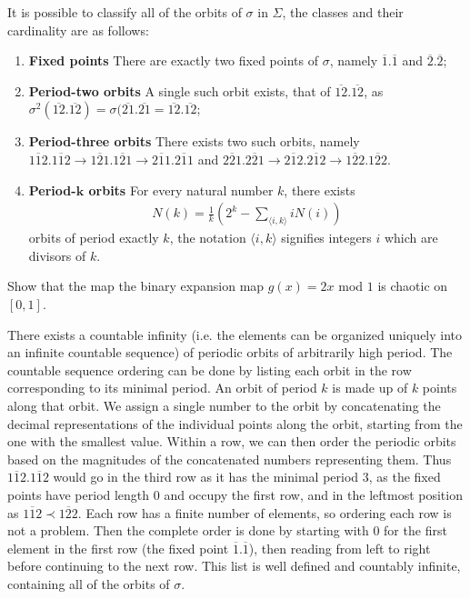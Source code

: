 It is possible to classify all of the orbits of $\sigma $ in $\Sigma$, the classes and their cardinality are as follows:
\begin{enumerate}
	\item \textbf{Fixed points} There are exactly two fixed points of $\sigma$, namely $\overline{1}\bm{.} \overline{1}$ and $\overline{2}\bm{.} \overline{2}$; 
	\item \textbf{Period-two orbits} A single such orbit exists, that of $\overline{12}\bm{.} \overline{12}$, as $\sigma^{2}(\overline{12}\bm{.} \overline{12}) = \sigma(\overline{21}\bm{.} \overline{21} = \overline{12}\bm{.} \overline{12}$;
	\item \textbf{Period-three orbits} There exists two such orbits, namely $\overline{112}\bm{.} \overline{112} \to \overline{121}\bm{.} \overline{121} \to \overline{211}\bm{.} \overline{211}$ and $\overline{221} \bm{.} \overline{221} \to \overline{212}\bm{.} \overline{212} \to \overline{122}\bm{.} \overline{122} $.
	\item \textbf{Period-$\bm{k} $ orbits} For every natural number $k$, there exists 
		\begin{align}
			\boxed{N(k) = \frac{1}{k}\left(2^k - \sum_{\langle i,k \rangle }^{} i N(i)\right)}		
		\end{align}
		orbits of period exactly $k$, the notation $\langle i,k\rangle$ signifies integers $i$ which are divisors of $k$.	
\end{enumerate}

\begin{exercise}
Show that the map the binary expansion map $g(x) = 2x$ mod $1$ is chaotic on $[0, 1]$.
\end{exercise}


There exists a countable infinity (i.e. the elements can be organized uniquely into an infinite countable sequence) of periodic orbits of arbitrarily high period. The countable sequence ordering can be done by listing each orbit in the row corresponding to its minimal period. An orbit of period $k$  is made up of $k$ points along that orbit. We assign a single number to the orbit by concatenating the decimal representations of the individual points along the orbit, starting from the one with the smallest value. Within a row, we can then order the periodic orbits based on the magnitudes of the concatenated numbers representing them. Thus $\overline{112}\bm{.} \overline{112}$ would go in the third row as it has the minimal period $3$, as the fixed points have period length $0$ and occupy the first row, and in the leftmost position as $\overline{112} \prec \overline{122}$. Each row has a finite number of elements, so ordering each row is not a problem. Then the complete order is done by starting with $0$ for the first element in the first row (the fixed point $\overline{1}\bm{.} \overline{1}$), then reading from left to right before continuing to the next row. This list is well defined and countably infinite, containing all of the orbits of $\sigma$.


